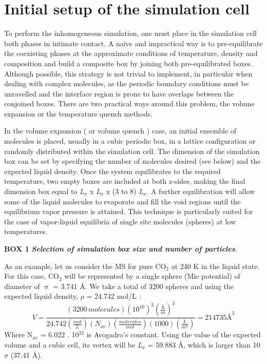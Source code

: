 \documentclass{scrbook}
\begin{document}
\section{Initial setup of the simulation cell}

To perform the inhomogeneous simulation, one must place in the simulation cell
both phases in intimate contact. A na\"{i}ve and impractical way is to
pre-equilibrate the coexisting phases at the approximate conditions of
temperature, density and composition and build a composite box by joining both
pre-equilibrated boxes. Although possible, this strategy is not trivial to
implement, in particular when dealing with complex molecules, as the periodic
boundary conditions must be unravelled and the interface region is prone to
have overlaps between the conjoined boxes. There are two practical ways around
this problem, the volume expansion or the temperature quench methods. 

In the volume expansion ( or volume quench \citep{holcomb1993} ) case,
an initial ensemble of molecules is placed,  usually in a cubic periodic box,
in a lattice configuration or randomly distributed within the simulation cell.
The dimension of the simulation box can be set by specifying the number of
molecules desired (see below) and the expected liquid density. Once the system
equilibrates to the required temperature, two empty boxes are included at both
z-sides, making the final dimension box equal to \textit{L}$_{x}$
x \textit{L}$_{x}$ x (3 to 8) \textit{L}$_{x}$.  A further equilibration will
allow some of the liquid molecules to evaporate and fill the void regions until
the equilibrium vapor pressure is attained. This technique is particularly
suited for the case of vapor-liquid equilibria of single site molecules
(spheres) at low temperatures. 

\textbf{BOX 1} \textbf{\textit{Selection of simulation box size and number of particles}}\textit{.}

As an example, let us consider the MS for pure CO$_{2}$ at 240 K in the liquid
state. For this case, CO$_{2}$ will be represented by a single sphere (Mie
potential) of diameter of {${\upsigma}$} = 3.741 \AA{}\citep{avendano2011}. We take a total of 3200 spheres
and using the expected liquid density, ${\rho}$ = 24.742 mol/L \citep{lemmon2013}:
\begin{equation}
V=\frac{\left(3200\,molecules\right)\left(10^{10}\right)^{3}\left(\frac{\textrm{Å}}{m}\right)^{3}}{24.742\left(\frac{mol}{L}\right)\left(N_{av}\right)\left(\frac{molecules}{mol}\right)\left(1000\right)\left(\frac{L}{m^{3}}\right)}=214735\textrm{Å}^{3}
\end{equation}
Where N$_{\mathrm{av}}$ = 6.022 . 10$^{23}$ is Avogadro's constant. Using the
value of the expected volume and a cubic cell, its vertex will be
\textit{L}$_{x}$ = 59.883 \AA{}, which is larger than 10 ${\sigma}$  (37.41
\AA{}). 
\end{document}
